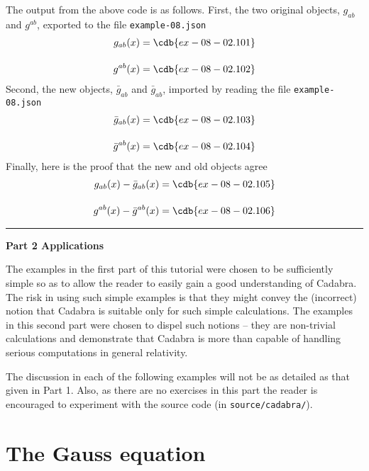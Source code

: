 \documentclass[a4paper,12pt]{article}
\numberwithin{equation}{section}%
\begin{document}
The output from the above code is as follows. First, the two original objects, $g_{ab}$ and
$g^{ab}$, exported to the file \verb|example-08.json|
\begin{align*}
   g_{ab}(x) &= \cdb{ex-08-02.101}\\[10pt]
   g^{ab}(x) &= \cdb{ex-08-02.102}
\end{align*}
Second, the new objects, $\bar{g}_{ab}$ and $\bar{g}_{ab}$, imported by reading the file
\verb|example-08.json|
\begin{align*}
   {\bar{g}}_{ab}(x) &= \cdb{ex-08-02.103}\\[10pt]
   {\bar{g}}^{ab}(x) &= \cdb{ex-08-02.104}
\end{align*}
Finally, here is the proof that the new and old objects agree
\begin{align*}
   g_{ab}(x) - {\bar{g}}_{ab}(x) &= \cdb{ex-08-02.105}\\[10pt]
   g^{ab}(x) - {\bar{g}}^{ab}(x) &= \cdb{ex-08-02.106}
\end{align*}

\clearpage

\hrule height 0pt
\vskip 4cm
{\Huge\bf Part 2 Applications}
\vskip 2cm

The examples in the first part of this tutorial were chosen to be sufficiently simple so as
to allow the reader to easily gain a good understanding of Cadabra. The risk in using such
simple examples is that they might convey the (incorrect) notion that Cadabra is suitable
only for such simple calculations. The examples in this second part were chosen to dispel
such notions -- they are non-trivial calculations and demonstrate that Cadabra is more than
capable of handling serious computations in general relativity.

The discussion in each of the following examples will not be as detailed as that given in
Part 1. Also, as there are no exercises in this part the reader is encouraged to experiment
with the source code (in \verb|source/cadabra/|).

\clearpage

\section{The Gauss equation}
\label{sec:ex-09}
\ResetCounters
\end{document}
